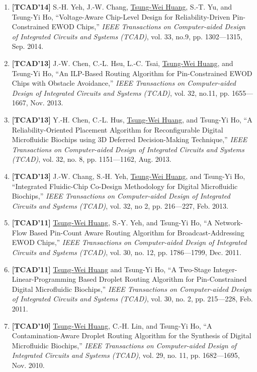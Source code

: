 \documentclass[A4,11pt]{article}
\begin{document}
\begin{enumerate}
  \item \textbf{[TCAD'14]} S.-H. Yeh, J.-W. Chang, \underline{Tsung-Wei Huang}, S.-T. Yu, and Tsung-Yi Ho, ``Voltage-Aware Chip-Level Design for Reliability-Driven Pin-Constrained EWOD Chips,'' \textit{IEEE Transactions on Computer-aided Design of Integrated Circuits and Systems (TCAD)}, vol. 33, no.9, pp. 1302—1315, Sep. 2014. 

  \item \textbf{[TCAD'13]} J.-W. Chen, C.-L. Hsu, L.-C. Tsai, \underline{Tsung-Wei Huang}, and Tsung-Yi Ho, ``An ILP-Based Routing Algorithm for Pin-Constrained EWOD Chips with Obstacle Avoidance,'' \textit{IEEE Transactions on Computer-aided Design of Integrated Circuits and Systems (TCAD)}, vol. 32, no.11, pp. 1655—1667, Nov. 2013.

  \item \textbf{[TCAD'13]} Y.-H. Chen, C.-L. Hus, \underline{Tsung-Wei Huang}, and Tsung-Yi Ho, ``A Reliability-Oriented Placement Algorithm for Reconfigurable Digital Microfluidic Biochips using 3D Deferred Decision-Making Technique,'' \textit{IEEE Transactions on Computer-aided Design of Integrated Circuits and Systems (TCAD)}, vol. 32, no. 8, pp. 1151—1162, Aug. 2013.

  \item \textbf{[TCAD'13]} J.-W. Chang, S.-H. Yeh, \underline{Tsung-Wei Huang}, and Tsung-Yi Ho, ``Integrated Fluidic-Chip Co-Design Methodology for Digital Microfluidic Biochips,'' \textit{IEEE Transactions on Computer-aided Design of Integrated Circuits and Systems (TCAD)}, vol. 32, no 2, pp. 216—227, Feb. 2013.

  \item \textbf{[TCAD'11]} \underline{Tsung-Wei Huang}, S.-Y. Yeh, and Tsung-Yi Ho, ``A Network-Flow Based Pin-Count Aware Routing Algorithm for Broadcast-Addressing EWOD Chips,'' \textit{IEEE Transactions on Computer-aided Design of Integrated Circuits and Systems (TCAD)}, vol. 30, no. 12, pp. 1786—1799, Dec. 2011.

  \item \textbf{[TCAD'11]} \underline{Tsung-Wei Huang} and Tsung-Yi Ho, ``A Two-Stage Integer-Linear-Programming Based Droplet Routing Algorithm for Pin-Constrained Digital Microfluidic Biochips,'' \textit{IEEE Transactions on Computer-aided Design of Integrated Circuits and Systems (TCAD)}, vol. 30, no. 2, pp. 215—228, Feb. 2011. 

  \item \textbf{[TCAD'10]} \underline{Tsung-Wei Huang}, C.-H. Lin, and Tsung-Yi Ho, ``A Contamination-Aware Droplet Routing Algorithm for the Synthesis of Digital Microfluidic Biochips,'' \textit{IEEE Transactions on Computer-aided Design of Integrated Circuits and Systems (TCAD)}, vol. 29, no. 11, pp. 1682—1695, Nov. 2010. 

 \end{enumerate}
\end{document}
